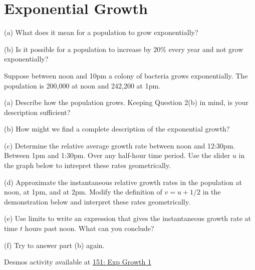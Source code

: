 \documentclass{ximera}
\begin{document}
\section*{Exponential Growth}
\begin{question}  \label{Qr435rhgnbh}
(a) What does it mean for a population to grow exponentially?

(b) Is it possible for a population to increase by $20\%$ every year and not grow exponentially?
\end{question}


\begin{question} \label{Qewrdfst5t}
Suppose between noon and 10pm a colony of bacteria grows exponentially. The population is 200,000 at noon and 242,200 at 1pm.

(a) Describe how the population grows. Keeping Question 2(b) in mind, is  your description sufficient?

(b) How might we find a complete description of the exponential growth?

(c) Determine the relative average growth rate between noon and 12:30pm. Between 1pm and 1:30pm. Over any half-hour time period. Use the slider $u$ in the graph below to intrepret these rates geometrically.

(d) Approximate the instantaneous relative growth rates in the population at noon, at 1pm, and at 2pm. Modify the definition of $v=u+1/2$ in the demonstration below and interpret these rates geometrically.

(e) Use limits to write an expression that gives the instantaneous growth rate at time $t$ hours past noon. What can you conclude? 

(f) Try to answer part (b) again.


\begin{onlineOnly}
    \begin{center}
\end{center}
\end{onlineOnly}


Desmos activity available at \href{https://www.desmos.com/calculator/wvpsotdhby}{151: Exp Growth 1}

\end{question}
\end{document}

